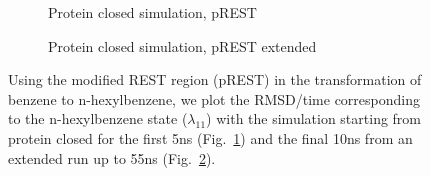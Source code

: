 \documentclass[T4paper.tex]{subfiles}
\begin{document}
\begin{figure}[!h]
\begin{subfigure}{\textwidth}
   \centering
    \caption{Protein closed simulation, pREST}
   \label{fig:c_opls3_rest1_1/RMSD-replica11}
\end{subfigure}
\centering
\begin{subfigure}{\textwidth}
  \centering
   \caption{Protein closed simulation, pREST extended}
   \label{fig:c_opls3_rest1_1/45-55ns/RMSD-replica11}
\end{subfigure}%
\caption{Using the modified REST region (pREST) in the transformation of benzene to n-hexylbenzene, we plot the RMSD/time corresponding to the n-hexylbenzene state ($\lambda_{11}$) with the simulation starting from protein closed for the first 5ns (Fig.~\ref{fig:c_opls3_rest1_1/RMSD-replica11}) and the final 10ns from an extended run up to 55ns (Fig.~\ref{fig:c_opls3_rest1_1/45-55ns/RMSD-replica11}).}
\label{fig:benzene_to_n-hexyl_pREST}
\end{figure}
\end{document}
